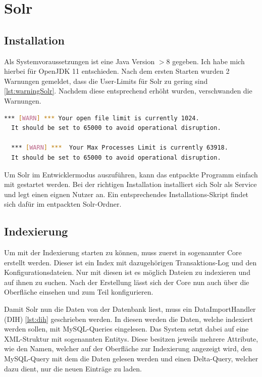 
\section{Solr}

\subsection{Installation}

Als Systemvoraussetzungen ist eine Java Version $> 8$ gegeben. Ich habe mich hierbei für OpenJDK 11 entschieden. 
Nach dem ersten Starten wurden 2 Warnungen gemeldet, dass die User-Limits für Solr zu gering sind \ref{lst:warningSolr}. Nachdem diese entsprechend erhöht wurden, verschwanden die Warnungen.

\begin{lstlisting}[language=bash, frame=single, label={lst:warningSolr}] 
  *** [WARN] *** Your open file limit is currently 1024.
  It should be set to 65000 to avoid operational disruption.

  *** [WARN] ***  Your Max Processes Limit is currently 63918.
  It should be set to 65000 to avoid operational disruption.
\end{lstlisting}

Um Solr im Entwicklermodus auszuführen, kann das entpackte Programm einfach mit  gestartet werden. 
Bei der richtigen Installation installiert sich Solr als Service und legt einen eignen Nutzer an. Ein entsprechendes Installations-Skript findet sich dafür im entpackten Solr-Ordner.

\subsection{Indexierung}

Um mit der Indexierung starten zu können, muss zuerst in sogenannter Core erstellt werden. Dieser ist ein Index mit dazugehörigen Transaktions-Log und den Konfigurationsdateien. Nur mit diesen ist es möglich Dateien zu indexieren und auf ihnen zu suchen. Nach der Erstellung lässt sich der Core nun auch über die Oberfläche einsehen und zum Teil konfigurieren.

Damit Solr nun die Daten von der Datenbank liest, muss ein DataImportHandler (DIH) \ref{lst:dih} geschrieben werden. In diesen werden die Daten, welche indexiert werden sollen, mit MySQL-Queries eingelesen. Das System setzt dabei auf eine XML-Struktur mit sogenannten Entitys. Diese besitzen jeweils mehrere Attribute, wie den Namen, welcher auf der Oberfläche zur Indexierung angezeigt wird, den MySQL-Query mit dem die Daten gelesen werden und einen Delta-Query, welcher dazu dient, nur die neuen Einträge zu laden. 

